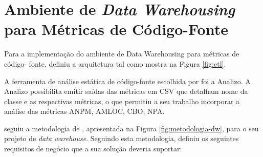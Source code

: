 \section{Ambiente de \textit{Data Warehousing} para Métricas de Código-Fonte}


Para a implementação do ambiente de Data Warehousing para métricas de código-
fonte,  definiu a arquitetura tal como mostra na Figura \ref{fig:etl}.

A ferramenta de análise estática de código-fonte escolhida por  foi a Analizo. A Analizo  possibilita emitir saídas das métricas em CSV que detalham nome da classe e as respectivas métricas, o que permitiu a seu trabalho incorporar a análise das métricas ANPM, AMLOC, CBO, NPA.

 seguiu a metodologia de \cite{Kimball2002}, apresentada na Figura \ref{fig:metodologia-dw}, para o seu projeto de \textit{data warehouse}. Seguindo esta metodologia,  definiu os seguintes requisitos de negócio que a sua solução deveria suportar:

